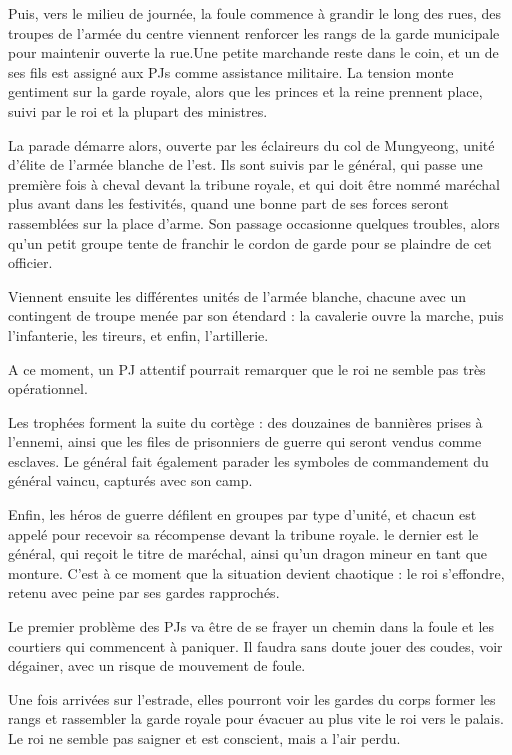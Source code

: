 \documentclass[10pt,a4paper]{book}
\begin{document}
Puis, vers le milieu de journée, la foule commence à grandir le long des rues, des troupes de l'armée du centre viennent renforcer les rangs de la garde municipale pour maintenir ouverte la rue.Une petite marchande reste dans le coin, et un de ses fils est assigné aux PJs comme assistance militaire. La tension monte gentiment sur la garde royale, alors que les princes et la reine prennent place, suivi par le roi et la plupart des ministres.

La parade démarre alors, ouverte par les éclaireurs du col de Mungyeong, unité d'élite de l'armée blanche de l'est. Ils sont suivis par le général, qui passe une première fois à cheval devant la tribune royale, et qui doit être nommé maréchal plus avant dans les festivités, quand une bonne part de ses forces seront rassemblées sur la place d'arme. Son passage occasionne quelques troubles, alors qu'un petit groupe tente de franchir le cordon de garde pour se plaindre de cet officier.

Viennent ensuite les différentes unités de l'armée blanche, chacune avec un contingent de troupe menée par son étendard : la cavalerie ouvre la marche, puis l'infanterie, les tireurs, et enfin, l'artillerie.

A ce moment, un PJ attentif pourrait remarquer que le roi ne semble pas très opérationnel.

Les trophées forment la suite du cortège : des douzaines de bannières prises à l'ennemi, ainsi que les files de prisonniers de guerre qui seront vendus comme esclaves. Le général fait également parader les symboles de commandement du général vaincu, capturés avec son camp.

Enfin, les héros de guerre défilent en groupes par type d'unité, et chacun est appelé pour recevoir sa récompense devant la tribune royale. le dernier est le général, qui reçoit le titre de maréchal, ainsi qu'un dragon mineur en tant que monture. C'est à ce moment que la situation devient chaotique : le roi s'effondre, retenu avec peine par ses gardes rapprochés. 

Le premier problème des PJs va être de se frayer un chemin dans la foule et les courtiers qui commencent à paniquer. Il faudra sans doute jouer des coudes, voir dégainer, avec un risque de mouvement de foule. 

Une fois arrivées sur l'estrade, elles pourront voir les gardes du corps former les rangs et rassembler la garde royale pour évacuer au plus vite le roi vers le palais. Le roi ne semble pas saigner et est conscient, mais a l'air perdu.
\end{document}

